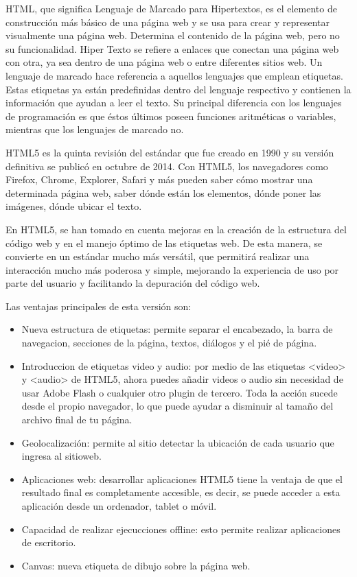 \documentclass[a4paper, 12pt]{book}
\begin{document}
HTML\cite{HTML5}, que significa Lenguaje de Marcado para Hipertextos, es el elemento de construcci\'on
m\'as b\'asico de una p\'agina web y se usa para crear y representar visualmente una p\'agina web.
Determina el contenido de la p\'agina web, pero no su funcionalidad. Hiper Texto se refiere a enlaces
que conectan una p\'agina web con otra, ya sea dentro de una p\'agina web o entre diferentes
sitios web. Un lenguaje de marcado hace referencia a aquellos lenguajes que emplean etiquetas.
Estas etiquetas ya est\'an predefinidas dentro del lenguaje respectivo y contienen la informaci\'on
que ayudan a leer el texto. Su principal diferencia con los lenguajes de programaci\'on es que
\'estos \'ultimos poseen funciones aritm\'eticas o variables, mientras que los lenguajes de marcado
no.

HTML5 es la quinta revisi\'on del est\'andar que fue creado en 1990 y su versi\'on definitiva se
public\'o en octubre de 2014. Con HTML5, los navegadores como Firefox, Chrome, Explorer,
Safari y m\'as pueden saber c\'omo mostrar una determinada p\'agina web, saber d\'onde est\'an los
elementos, d\'onde poner las im\'agenes, d\'onde ubicar el texto.

En HTML5, se han tomado en cuenta mejoras en la creaci\'on de la estructura del c\'odigo web
y en el manejo \'optimo de las etiquetas web. De esta manera, se convierte en un est\'andar mucho
m\'as vers\'atil, que permitir\'a realizar una interacci\'on mucho m\'as poderosa y simple, mejorando
la experiencia de uso por parte del usuario y facilitando la depuraci\'on del c\'odigo web.

Las ventajas principales de esta versi\'on son:

\begin{itemize}
  \item Nueva estructura de etiquetas: permite separar el encabezado, la barra de navegacion, secciones de la p\'agina, textos, di\'alogos y el pi\'e de p\'agina.
 \item Introduccion de etiquetas video y audio: por medio de las etiquetas <video> y <audio> de HTML5, ahora puedes a\~nadir videos o audio sin necesidad de usar Adobe Flash o cualquier otro plugin de tercero. Toda la acci\'on sucede desde el propio navegador, lo que puede ayudar a disminuir al tama\~no del archivo final de tu p\'agina. 
 \item Geolocalizaci\'on: permite al sitio detectar la ubicaci\'on de cada usuario que ingresa al sitioweb.
 \item Aplicaciones web: desarrollar aplicaciones HTML5 tiene la ventaja de que el resultado final es completamente accesible, es decir, se puede acceder a esta aplicaci\'on desde un ordenador, tablet o m\'ovil.
 \item Capacidad de realizar ejecucciones offline: esto permite realizar aplicaciones de escritorio.
 \item Canvas: nueva etiqueta de dibujo sobre la p\'agina web.

\end{itemize}
\end{document}
